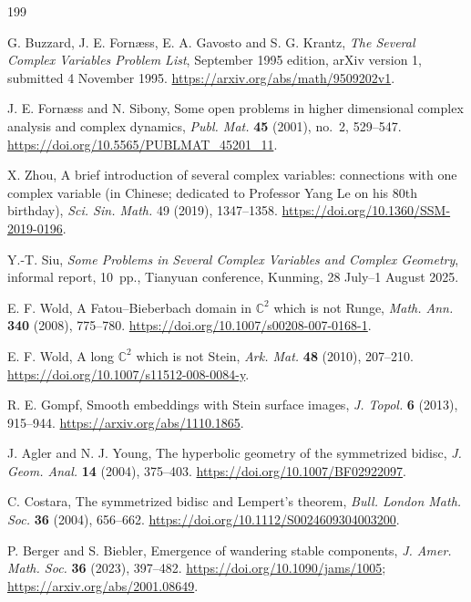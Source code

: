 \documentclass[11pt,reqno]{amsart}
\theoremstyle{definition}
\theoremstyle{remark}
\begin{document}
\clearpage
\begin{thebibliography}{199}
\small\raggedright
\setlength{\itemsep}{1pt}
\setlength{\parskip}{0pt}

 G. Buzzard, J. E. Forn\ae ss, E. A. Gavosto and S. G. Krantz, \emph{The Several Complex Variables Problem List}, September 1995 edition, arXiv version 1, submitted 4 November 1995. \url{https://arxiv.org/abs/math/9509202v1}.

 J. E. Forn\ae ss and N. Sibony, Some open problems in higher dimensional complex analysis and complex dynamics, \emph{Publ. Mat.} \textbf{45} (2001), no.~2, 529--547. \url{https://doi.org/10.5565/PUBLMAT_45201_11}.

 X. Zhou, A brief introduction of several complex variables: connections with one complex variable (in Chinese; dedicated to Professor Yang Le on his 80th birthday), \emph{Sci. Sin. Math.} 49 (2019), 1347--1358. \url{https://doi.org/10.1360/SSM-2019-0196}.

 Y.-T. Siu, \emph{Some Problems in Several Complex Variables and Complex Geometry}, informal report, 10~pp., Tianyuan conference, Kunming, 28 July--1 August 2025.

 E. F. Wold, A Fatou--Bieberbach domain in $\mathbb C^2$ which is not Runge, \emph{Math. Ann.} \textbf{340} (2008), 775--780. \url{https://doi.org/10.1007/s00208-007-0168-1}.

 E. F. Wold, A long $\mathbb C^2$ which is not Stein, \emph{Ark. Mat.} \textbf{48} (2010), 207--210. \url{https://doi.org/10.1007/s11512-008-0084-y}.

 R. E. Gompf, Smooth embeddings with Stein surface images, \emph{J. Topol.} \textbf{6} (2013), 915--944. \url{https://arxiv.org/abs/1110.1865}.

 J. Agler and N. J. Young, The hyperbolic geometry of the symmetrized bidisc, \emph{J. Geom. Anal.} \textbf{14} (2004), 375--403. \url{https://doi.org/10.1007/BF02922097}.

 C. Costara, The symmetrized bidisc and Lempert's theorem, \emph{Bull. London Math. Soc.} \textbf{36} (2004), 656--662. \url{https://doi.org/10.1112/S0024609304003200}.

 P. Berger and S. Biebler, Emergence of wandering stable components, \emph{J. Amer. Math. Soc.} \textbf{36} (2023), 397--482. \url{https://doi.org/10.1090/jams/1005}; \url{https://arxiv.org/abs/2001.08649}.


\end{thebibliography}
\end{document}
